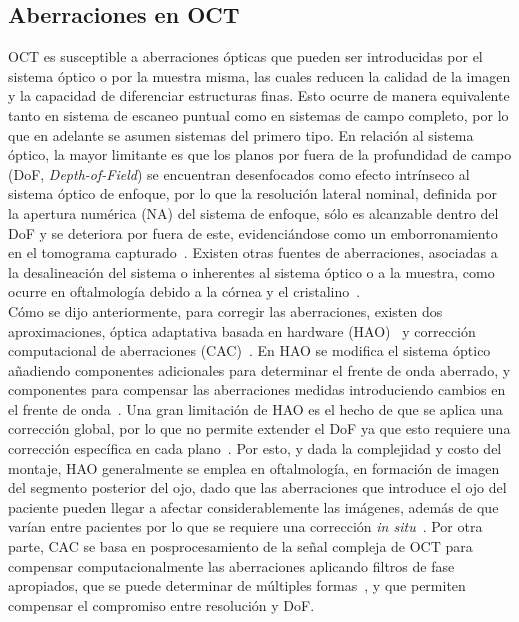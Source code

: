 \documentclass[letter, 12 pt]{article}
\begin{document}
	\subsection{Aberraciones en OCT}

OCT es susceptible a aberraciones ópticas que pueden ser introducidas por el sistema óptico o por la muestra misma, las cuales reducen la calidad de la imagen y la capacidad de diferenciar estructuras finas. Esto ocurre de manera equivalente tanto en sistema de escaneo puntual como en sistemas de campo completo, por lo que en adelante se asumen sistemas del primero tipo. En relación al sistema óptico, la mayor limitante es que los planos por fuera de la profundidad de campo (DoF, \textit{Depth-of-Field}) se encuentran desenfocados como efecto intrínseco al sistema óptico de enfoque, por lo que la resolución lateral nominal, definida por la apertura numérica (NA) del sistema de enfoque, sólo es alcanzable dentro del DoF y se deteriora por fuera de este, evidenciándose como un emborronamiento en el tomograma capturado~\cite{drexler2015}. Existen otras fuentes de aberraciones, asociadas a la desalineación del sistema o inherentes al sistema óptico o a la muestra, como ocurre en oftalmología debido a la córnea y el cristalino~\cite{liang1994, thibos2002}. \\

Cómo se dijo anteriormente, para corregir las aberraciones, existen dos aproximaciones, óptica adaptativa basada en hardware (HAO)~\cite{pircher2017} y corrección computacional de aberraciones (CAC)~\cite{liu2017}. En HAO se modifica el sistema óptico añadiendo componentes adicionales para determinar el frente de onda aberrado, y componentes para compensar las aberraciones medidas introduciendo cambios en el frente de onda~\cite{zawadzki2011}. Una gran limitación de HAO es el hecho de que se aplica una corrección global, por lo que no permite extender el DoF ya que esto requiere una corrección específica en cada plano~\cite{pircher2017}. Por esto, y dada la complejidad y costo del montaje, HAO generalmente se emplea en oftalmología, en formación de imagen del segmento posterior del ojo, dado que las aberraciones que introduce el ojo del paciente pueden llegar a afectar considerablemente las imágenes, además de que varían entre pacientes por lo que se requiere una corrección \emph{in situ}~\cite{zawadzki2011,felberer2014}. Por otra parte, CAC se basa en posprocesamiento de la señal compleja de OCT para compensar computacionalmente las aberraciones aplicando filtros de fase apropiados, que se puede determinar de múltiples formas~\cite{liu2017, adie2012, kumar2014}, y que permiten compensar el compromiso entre resolución y DoF. \\
\end{document}
